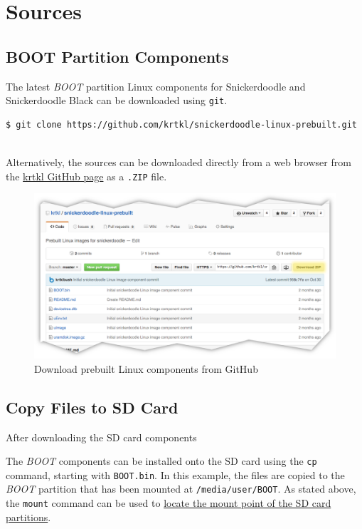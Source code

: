\section{Sources}

\subsection{BOOT Partition Components}

The latest \textit{BOOT} partition Linux components for Snickerdoodle and Snickerdoodle Black can be downloaded using \texttt{git}. \\
\begin{lstlisting}[language=bash]
$ git clone https://github.com/krtkl/snickerdoodle-linux-prebuilt.git
\end{lstlisting}

~\\
\noindent
Alternatively, the sources can be downloaded directly from a web browser from the \href{https://github.com/krtkl/snickerdoodle-linux-prebuilt}{krtkl GitHub page} as a \texttt{.ZIP} file.

\begin{figure}[h!]
\centering
	\includegraphics{images/github-prebuilt.png}
	\caption{Download prebuilt Linux components from GitHub}
	\label{fig:githubprebuilt}
\end{figure}


\subsection{Copy Files to SD Card}
After downloading the SD card components

\noindent
The \textit{BOOT} components can be installed onto the SD card using the \texttt{cp} command, starting with \texttt{BOOT.bin}. In this example, the files are copied to the \textit{BOOT} partition that has been mounted at \texttt{/media/user/BOOT}. As stated above, the \texttt{mount} command can be used to \hyperref[sub:locatesd]{locate the mount point of the SD card partitions}. \\

